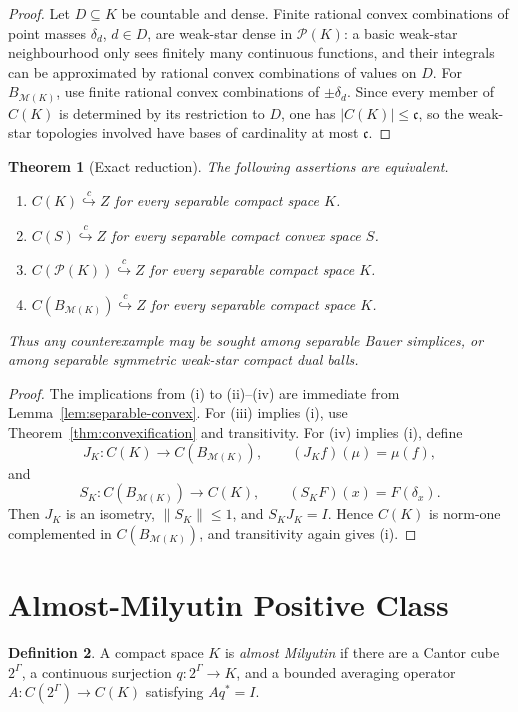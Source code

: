\documentclass[11pt]{article}
\newtheorem{theorem}{Theorem}[section]
\theoremstyle{definition}
\newtheorem{definition}[theorem]{Definition}
\theoremstyle{remark}
\newcommand{\C}{C}
\newcommand{\cc}{\mathfrak c}
\newcommand{\Pp}{\mathcal P}
\newcommand{\M}{\mathcal M}
\newcommand{\Id}{I}
\newcommand{\hookc}{\stackrel{c}{\hookrightarrow}}
\begin{document}
\begin{proof}
Let \(D\subseteq K\) be countable and dense.  Finite rational convex
combinations of point masses \(\delta_d\), \(d\in D\), are weak-star dense in
\(\Pp(K)\): a basic weak-star neighbourhood only sees finitely many
continuous functions, and their integrals can be approximated by rational
convex combinations of values on \(D\).  For \(B_{\M(K)}\), use finite
rational convex combinations of \(\pm\delta_d\).  Since every member of
\(\C(K)\) is determined by its restriction to \(D\), one has
\(|\C(K)|\leq\cc\), so the weak-star topologies involved have bases of
cardinality at most \(\cc\).
\end{proof}

\begin{theorem}[Exact reduction]\label{thm:exact}
The following assertions are equivalent.
\begin{enumerate}[label=\textup{(\roman*)}]
\item \(\C(K)\hookc Z\) for every separable compact space \(K\).
\item \(\C(S)\hookc Z\) for every separable compact convex space \(S\).
\item \(\C(\Pp(K))\hookc Z\) for every separable compact space \(K\).
\item \(\C(B_{\M(K)})\hookc Z\) for every separable compact space \(K\).
\end{enumerate}
Thus any counterexample may be sought among separable Bauer simplices, or
among separable symmetric weak-star compact dual balls.
\end{theorem}

\begin{proof}
The implications from (i) to (ii)--(iv) are immediate from
Lemma~\ref{lem:separable-convex}.  For (iii) implies (i), use
Theorem~\ref{thm:convexification} and transitivity.  For (iv) implies (i),
define
\[
J_K:\C(K)\to\C(B_{\M(K)}),\qquad (J_Kf)(\mu)=\mu(f),
\]
and
\[
S_K:\C(B_{\M(K)})\to\C(K),\qquad (S_KF)(x)=F(\delta_x).
\]
Then \(J_K\) is an isometry, \(\|S_K\|\leq1\), and \(S_KJ_K=\Id\).  Hence
\(\C(K)\) is norm-one complemented in \(\C(B_{\M(K)})\), and transitivity
again gives (i).
\end{proof}

\section{Almost-Milyutin Positive Class}

\begin{definition}
A compact space \(K\) is \emph{almost Milyutin} if there are a Cantor cube
\(2^\Gamma\), a continuous surjection \(q:2^\Gamma\to K\), and a bounded
averaging operator \(A:\C(2^\Gamma)\to\C(K)\) satisfying \(Aq^*=\Id\).
\end{definition}
\end{document}
